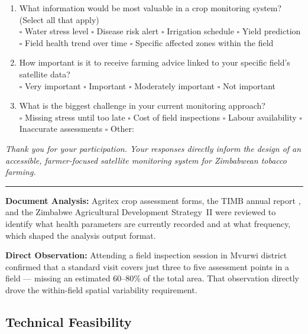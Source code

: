 \documentclass[12pt,a4paper]{report}
\begin{document}
\begin{enumerate}[resume]
  \item What information would be most valuable in a crop monitoring system? (Select all that apply)\\
  $\square$ Water stress level \quad $\square$ Disease risk alert \quad $\square$ Irrigation schedule \quad $\square$ Yield prediction \quad $\square$ Field health trend over time \quad $\square$ Specific affected zones within the field

  \item How important is it to receive farming advice linked to your specific field's satellite data?\\
  $\square$ Very important \quad $\square$ Important \quad $\square$ Moderately important \quad $\square$ Not important

  \item What is the biggest challenge in your current monitoring approach?\\
  $\square$ Missing stress until too late \quad $\square$ Cost of field inspections \quad $\square$ Labour availability \quad $\square$ Inaccurate assessments \quad $\square$ Other: \underline{\hspace{3cm}}
\end{enumerate}

\noindent\textit{Thank you for your participation. Your responses directly inform the design of an accessible, farmer-focused satellite monitoring system for Zimbabwean tobacco farming.}

\vspace{0.1cm}
\noindent\rule{\linewidth}{0.4pt}
\vspace{0.3cm}

\noindent\textbf{Document Analysis:} Agritex crop assessment forms, the TIMB annual report \citep{timb2023}, and the Zimbabwe Agricultural Development Strategy~II \citep{moa2022} were reviewed to identify what health parameters are currently recorded and at what frequency, which shaped the analysis output format.

\noindent\textbf{Direct Observation:} Attending a field inspection session in Mvurwi district confirmed that a standard visit covers just three to five assessment points in a field — missing an estimated 60--80\% of the total area. That observation directly drove the within-field spatial variability requirement.

\subsection{Technical Feasibility}
\end{document}
